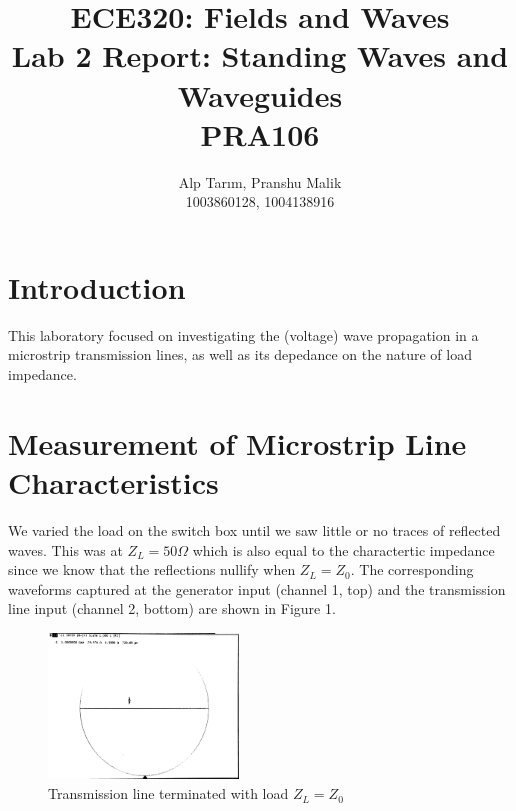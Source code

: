 \documentclass[10pt]{article}
\date{}
\begin{document}
\title{\textbf{\Large{\textsc{ECE320:} Fields and Waves}} \\ \Large{Lab 2 Report: Standing Waves and Waveguides} \\ \textbf{\small{PRA106}}\vspace{-0.3cm}}
\author{Alp Tarım, Pranshu Malik \\ \footnotesize{1003860128}, \footnotesize{1004138916}}

\maketitle

\section{Introduction}

This laboratory focused on investigating the (voltage) wave propagation in a microstrip transmission lines, 
as well as its depedance on the nature of load impedance.

\section{Measurement of Microstrip Line Characteristics}

We varied the load on the switch box until we saw little or no traces of reflected waves.
This was at $Z_L = 50 \Omega$ which is also equal to the charactertic impedance 
since we know that the reflections nullify when $Z_L = Z_0$. The corresponding waveforms
captured at the generator input (channel 1, top) and the transmission line input (channel 2, bottom) 
are shown in Figure 1.

\begin{figure}[h]
    \centering
    \includegraphics[width=0.45\textwidth]{../photos/lab2/unkwn-load.jpg}
    \caption{Transmission line terminated with load $Z_L = Z_0$\vspace{-0.5cm}}
    \label{tline_matching_z_0}
\end{figure}
\end{document}
